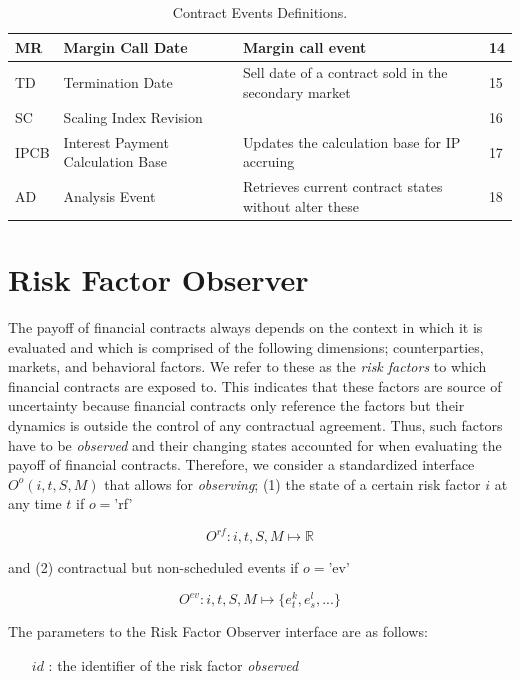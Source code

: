 \documentclass[9pt,oneside]{amsart}
\newcommand{\Real}{\mathbb{R}}
\newcommand{\obsfull}[5]{O^{#1}(#2,#3,#4,#5)}
\newcommand{\obsfunc}[1]{O^{#1}}
\begin{document}
\begin{multicols}{2}
\begin{table}[H]
\begin{tabular}{| p{0.23in}p{0.7in}p{1.4in}p{0.2in} |}
	\hline
	MR & Margin Call Date & Margin call event & 14 \\
	\hline
	TD & Termination Date & Sell date of a contract sold in the secondary market & 15 \\
	\hline
	SC & Scaling Index Revision & & 16 \\
	\hline
	IPCB & Interest Payment Calculation Base & Updates the calculation base for IP accruing & 17 \\
	\hline
	AD & Analysis Event & Retrieves current contract states without alter these & 18 \\
	\hline
	\end{tabular}
	\caption{Contract Events Definitions.}
	\label{tbl:events}
\end{table}





\section{Risk Factor Observer}\label{rfmodel}

The payoff of financial contracts always depends on the context in which it is evaluated and which is comprised of the following dimensions; counterparties, markets, and behavioral factors. We refer to these as the \textit{risk factors} to which financial contracts are exposed to. This indicates that these factors are source of uncertainty because financial contracts only reference the factors but their dynamics is outside the control of any contractual agreement. Thus, such factors have to be \textit{observed} and their changing states accounted for when evaluating the payoff of financial contracts. Therefore, we consider a standardized interface $\obsfull{o}{i}{t}{S}{M}$ that allows for \textit{observing}; (1) the state of a certain risk factor $i$ at any time $t$ if $o=$'rf'

\[
	\obsfunc{rf}: i,t,S,M \mapsto \Real
\]

and (2) contractual but non-scheduled events if $o=$'ev'

\[
	\obsfunc{ev}: i,t,S,M \mapsto \{e_t^{k},e_s^{l},...\}
\]

The parameters to the Risk Factor Observer interface are as follows:

\begin{itemize}
	\item[$id$]: the identifier of the risk factor \textit{observed}


\end{itemize}
\end{multicols}
\end{document}
